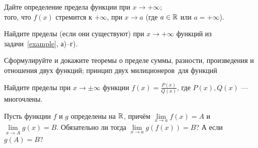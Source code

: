 \documentclass[a4paper, 12pt]{article}
\newcommand{\0}[1]{\overline{#1}}
\begin{document}

 Дайте определение
 предела функции при $x \to +\infty$;\\
 того, что $f(x)$ стремится к $+\infty$, при $x \to a$
(где $a\in \mathbb{R}$ или $a=+\infty$).

 Найдите пределы (если они существуют) при
$x \to +\infty$ функций из задачи~\ref{example}, а)--г).










Сформулируйте и докажите
 теоремы о пределе суммы, разности,
произведения и отношения двух функций;
 принцип двух милиционеров\ для функций




 Найдите пределы при $x \to \pm \infty$ функции $f(x)=\frac{P(x)}{Q(x)}$,
где $P(x),Q(x)$ --- многочлены. %

 Пусть функции $f$ и $g$ определены на $\mathbb{R}$, прич\"ем
$\lim\limits_{x \to a}f(x)=A$ и $\lim\limits_{x \to A}g(x)=B$.
Обязательно ли тогда $\lim\limits_{x \to a}g(f(x))=B$?
 А если $g(A)=B$?

\end{document}
